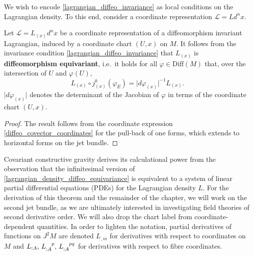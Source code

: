 We wish to encode \eqref{lagrangian_diffeo_invariance} as local conditions on the Lagrangian density. To this end, consider a coordinate representation $\mathcal L = Ld^nx$. 
\begin{proposition}
  Let $\mathcal L = L_{(x)}d^nx$ be a coordinate representation of a diffeomorphism invariant Lagrangian, induced by a coordinate chart $(U,x)$ on $M$. It follows from the invariance condition \eqref{lagrangian_diffeo_invariance} that $L_{(x)}$ is \textbf{diffeomorphism equivariant}, i.e.~it holds for all $\varphi\in\mathrm{Diff}(M)$ that, over the intersection of $U$ and $\varphi(U)$,
  \begin{equation}\label{lagrangian_density_diffeo_equivariance}
    L_{(x)}\circ j^k_{(x)}(\varphi_E) = \lvert d\varphi_{(x)}\rvert^{-1} L_{(x)}.
  \end{equation}
  $\lvert d\varphi_{(x)}\rvert$ denotes the determinant of the Jacobian of $\varphi$ in terms of the coordinate chart $(U,x)$.
\end{proposition}
\begin{proof}
  The result follows from the coordinate expression \eqref{diffeo_covector_coordinates} for the pull-back of one forms, which extends to horizontal forms on the jet bundle.
\end{proof}

Covariant constructive gravity derives its calculational power from the observation that the infinitesimal version of \eqref{lagrangian_density_diffeo_equivariance} is equivalent to a system of linear partial differential equations (PDEs) for the Lagrangian density $L$. For the derivation of this theorem and the remainder of the chapter, we will work on the second jet bundle, as we are ultimately interested in investigating field theories of second derivative order. We will also drop the chart label from coordinate-dependent quantities. In order to lighten the notation, partial derivatives of functions on $J^2M$ are denoted $L_{,m}$ for derivatives with respect to coordinates on $M$ and $L_{:A},\,L_{:A}^{\hphantom{:A}p},\,L_{:A}^{\hphantom{:A}pq}$ for derivatives with respect to fibre coordinates.

